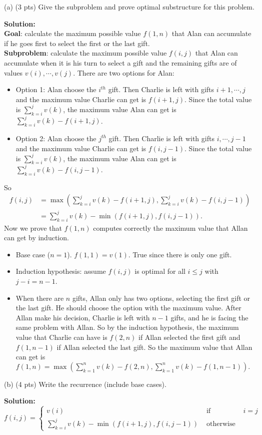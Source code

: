 \documentclass{article}
\begin{document}
(a) (3 pts) Give the subproblem and prove optimal substructure for this problem.
\begin{tcolorbox}
\textbf{Solution:} \\
\textbf{Goal}: calculate the maximum possible value $f(1, n)$ that Alan can accumulate if he goes first to select the first or the last gift. \\
\textbf{Subproblem}: calculate the maximum possible value $f(i, j)$ that Alan can accumulate when it is his turn to select a gift and the remaining gifts are of values $v(i), \cdots, v(j)$. There are two options for Alan:
\begin{itemize}
\item Option 1: Alan choose the $i^{th}$ gift. Then Charlie is left with gifts $i+1, \cdots, j$ and the maximum value Charlie can get is $f(i+1, j)$. Since the total value is $\sum_{k=i}^j v(k)$, the maximum value Alan can get is $\sum_{k=i}^j v(k) - f(i + 1, j)$. 
\item Option 2: Alan choose the $j^{th}$ gift. Then Charlie is left with gifts $i, \cdots, j-1$ and the maximum value Charlie can get is $f(i, j-1)$. Since the total value is $\sum_{k=i}^j v(k)$, the maximum value Alan can get is $\sum_{k=i}^j v(k) - f(i, j-1)$. 
\end{itemize}
So 
\begin{align*}
f(i,j) 
& = \max(\sum_{k=i}^j v(k) - f(i + 1, j), \sum_{k=i}^j v(k) - f(i , j-1))\\
& = \sum_{k=i}^j v(k) - \min(f(i + 1, j), f(i, j-1)).
\end{align*}
Now we prove that $f(1,n)$ computes correctly the maximum value that Allan can get by induction. 
\begin{itemize}
\item Base case ($n = 1$). $f(1,1) = v(1)$. True since there is only one gift.
\item Induction hypothesis: assume $f(i,j)$ is optimal for all $i \leq j$ with $j -i = n - 1$.
\item When there are $n$ gifts, Allan only has two options, selecting the first gift or the last gift. He should choose the option with the maximum value. After Allan make his decision, Charlie is left with $n - 1$ gifts, and he is facing the same problem with Allan. So by the induction hypothesis, the maximum value that Charlie can have is $f(2,n)$ if Allan selected the first gift and $f(1,n-1)$ if Allan selected the last gift. So the maximum value that Allan can get is $f(1,n) = \max(\sum_{k=1}^n v(k) - f(2, n), \sum_{k=1}^n v(k) - f(1 , n-1)).$
\end{itemize}
\end{tcolorbox}
(b) (4 pts) Write the recurrence (include base cases).
\begin{tcolorbox}
\textbf{Solution:} 
$$f(i, j) = \left \{ \begin{array}{lcr} v(i) & \mbox{ if } & i = j \\ 
\sum_{k=i}^j v(k) - \min(f(i + 1, j), f(i, j-1)) & \mbox{ otherwise } &
  \end{array} \right.$$
\end{tcolorbox}
\end{document}
